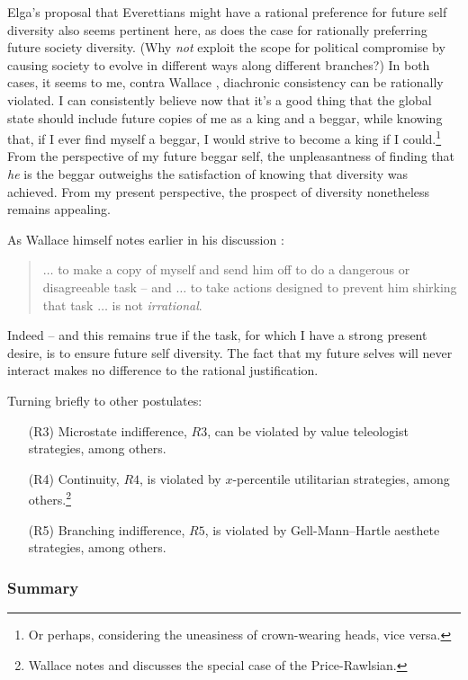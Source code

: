 \documentclass[aps,
pra,epsfig,12pt]{revtex4}
\begin{document}
Elga's proposal that Everettians might have a rational preference for 
future self diversity \cite{wallacevoltwoelga} also seems pertinent
here, as does the case for rationally preferring future 
society diversity.  (Why {\it not} 
exploit the scope for political compromise by causing   
society to evolve in different ways along different branches?) 
In both cases, it seems to me, 
contra Wallace \cite{wallacevoltwoelga}, diachronic 
consistency can be rationally violated.  
I can consistently believe now that it's a good thing that the 
global state should include future copies of me as a king and a beggar, 
while knowing that, if I ever find myself a beggar, I would strive to become
a king if I could.\footnote{Or perhaps, considering the uneasiness of 
crown-wearing heads, vice versa.}  From the perspective
of my future beggar self, the unpleasantness
of finding that {\it he} is the beggar outweighs the satisfaction of knowing
that diversity was achieved.   From my present perspective, the 
prospect of diversity nonetheless remains appealing. 

As Wallace himself notes earlier in his discussion \cite{wallacetwodictates}: 
\begin{quotation}
$\ldots$ to make a copy of myself and send him off to do a dangerous or 
disagreeable task -- and $\ldots$ to take actions designed to
prevent him shirking that task $\ldots$ is not {\it irrational}.
\end{quotation}
Indeed -- and this remains true if the task, for which I have a strong present
desire, is to ensure future self diversity.  The fact that my future 
selves will never interact makes no difference to the rational justification. 

Turning briefly to other postulates:
\begin{itemize}
\item[(R3)] Microstate indifference, $R3$, can be violated by value
teleologist strategies, among others.   
\item[(R4)] Continuity, $R4$, is 
violated by $x$-percentile utilitarian strategies,
among others.\footnote{Wallace \cite{wallacevoltwo} notes and discusses 
the special case of the Price-Rawlsian.}
\item[(R5)] Branching indifference, $R5$,
is violated by Gell-Mann--Hartle aesthete strategies, among others.  
\end{itemize}

\subsubsection{Summary}
\end{document}
